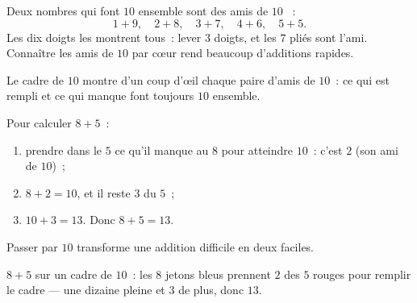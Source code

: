 \begin{example}[Compléments à 10]\label{ex:g1:addition:friends}
Deux nombres qui font $10$ ensemble sont des \guillemotleft{} amis de
$10$ \guillemotright{}~:
\[
1 + 9, \quad 2 + 8, \quad 3 + 7, \quad 4 + 6, \quad 5 + 5 .
\]
Les dix doigts les montrent tous~: lever $3$ doigts, et les $7$
pliés sont l'ami. Connaître les amis de $10$ par cœur rend
beaucoup d'additions rapides.
\end{example}

\begin{omfigure}

{\small Le cadre de $10$ montre d'un coup d'œil chaque paire
d'amis de $10$~: ce qui est rempli et ce qui manque font toujours
$10$ ensemble.}
\end{omfigure}

\begin{method}\label{met:g1:addition:crossten}
Pour calculer $8 + 5$~:
\begin{enumerate}
  \item prendre dans le $5$ ce qu'il manque au $8$ pour atteindre
        $10$~: c'est $2$ (son ami de $10$)~;
  \item $8 + 2 = 10$, et il reste $3$ du $5$~;
  \item $10 + 3 = 13$. Donc $8 + 5 = 13$.
\end{enumerate}
Passer par $10$ transforme une addition difficile en deux faciles.
\end{method}

\begin{omfigure}

{\small $8 + 5$ sur un cadre de $10$~: les $8$ jetons bleus prennent
$2$ des $5$ rouges pour remplir le cadre --- une dizaine pleine et
$3$ de plus, donc $13$.}
\end{omfigure}

